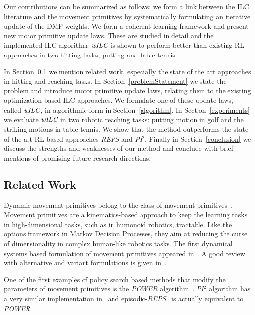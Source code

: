 Our contributions can be summarized as follows: we form a link between the ILC literature and the movement primitives by systematically formulating an iterative update of the DMP weights. We form a coherent learning framework and present new motor primitive update laws. These are studied in detail and the implemented ILC algorithm~$\emph{wILC}$ is shown to perform better than existing RL approaches in two hitting tasks, putting and table tennis.

In Section~\ref{relatedWork} we mention related work, especially the state of the art approaches in hitting and reaching tasks. In Section~\ref{problemStatement} we state the problem and introduce motor primitive update laws, relating them to the existing optimization-based ILC approaches. We formulate one of these update laws, called $\emph{wILC}$, in algorithmic form in Section~\ref{algorithm}. In Section~\ref{experiments} we evaluate $\emph{wILC}$ in two robotic reaching tasks: putting motion in golf and the striking motions in table tennis. We show that the method outperforms the state-of-the-art RL-based approaches \emph{REPS} and \emph{PI$^{2}$}. Finally in Section~\ref{conclusion} we discuss the strengths and weaknesses of our method and conclude with brief mentions of promising future research directions.

\subsection{Related Work}\label{relatedWork}

Dynamic movement primitives belong to the class of movement primitives~\cite{Flash85}. Movement primitives are a kinematics-based approach to keep the learning tasks in high-dimensional tasks, such as in humonoid robotics, tractable. Like the options framework in Markov Decision Processes, they aim at reducing the curse of dimensionality in complex human-like robotics tasks. The first dynamical systems based formulation of movement primitives appeared in~\cite{Ijspeert02}. A good review with alternative and variant formulations is given in~\cite{Ijspeert13}.

One of the first examples of policy search based methods that modify the parameters of movement primitives is the \emph{POWER} algorithm~\cite{Kober08}. \emph{PI$^{2}$} algorithm has a very similar implementation in~\cite{Theodorou10} and episodic-\emph{REPS}~\cite{Peter10} is actually equivalent to \emph{POWER}.

